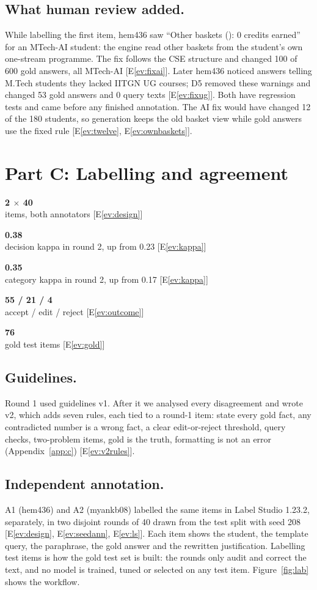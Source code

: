 \documentclass[11pt,a4paper]{article}
\newcommand{\kn}[2]{\begin{minipage}[t]{0.185\linewidth}\centering
  {\LARGE\bfseries\color{accent}#1}\\[1pt]{\footnotesize\setstretch{0.95}\color{black!75}#2}\end{minipage}}
\newcounter{ev}
\newcommand{\ev}[1]{E\ref{ev:#1}}
\begin{document}
\subsection{What human review added.}
While labelling the first item, hem436 saw ``Other baskets (): 0 credits earned'' for an MTech-AI student: the
engine read other baskets from the student's own one-stream programme. The fix follows the CSE structure and changed
100 of 600 gold answers, all MTech-AI [\ev{fixai}]. Later hem436 noticed answers telling M.Tech students they lacked
IITGN UG courses; D5 removed these warnings and changed 53 gold answers and 0 query texts [\ev{fixug}]. Both have
regression tests and came before any finished annotation. The AI fix would have changed 12 of the 180 students, so
generation keeps the old basket view while gold answers use the fixed rule [\ev{twelve}, \ev{ownbaskets}].

\section{Part C: Labelling and agreement}
\begin{keybox}
\kn{2 $\times$ 40}{items, both annotators [\ev{design}]}\hfill
\kn{0.38}{decision kappa in round 2, up from 0.23 [\ev{kappa}]}\hfill
\kn{0.35}{category kappa in round 2, up from 0.17 [\ev{kappa}]}\hfill
\kn{55 / 21 / 4}{accept / edit / reject [\ev{outcome}]}\hfill
\kn{76}{gold test items [\ev{gold}]}
\end{keybox}

\subsection{Guidelines.}
Round 1 used guidelines v1. After it we analysed every disagreement and wrote v2, which adds seven rules, each tied
to a round-1 item: state every gold fact, any contradicted number is a wrong fact, a clear edit-or-reject threshold,
query checks, two-problem items, gold is the truth, formatting is not an error (Appendix~\ref{app:c})
[\ev{v2rules}].

\subsection{Independent annotation.}
A1 (hem436) and A2 (myankb08) labelled the same items in Label Studio 1.23.2, separately, in two disjoint rounds of
40 drawn from the test split with seed 208 [\ev{design}, \ev{seedann}, \ev{ls}]. Each item shows the student, the
template query, the paraphrase, the gold answer and the rewritten justification. Labelling test items is how the gold
test set is built: the rounds only audit and correct the text, and no model is trained, tuned or selected on any
test item. Figure~\ref{fig:lab} shows the workflow.
\end{document}
